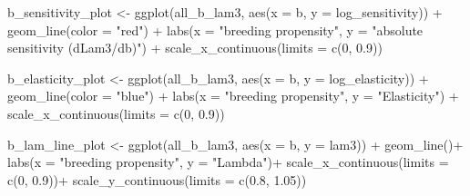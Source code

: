 \documentclass[
  letterpaper,
  DIV=11,
  numbers=noendperiod]{scrartcl}
\newenvironment{Shaded}{\begin{snugshade}}{\end{snugshade}}
\newcommand{\AttributeTok}[1]{\textcolor[rgb]{0.40,0.45,0.13}{#1}}
\newcommand{\DecValTok}[1]{\textcolor[rgb]{0.68,0.00,0.00}{#1}}
\newcommand{\FloatTok}[1]{\textcolor[rgb]{0.68,0.00,0.00}{#1}}
\newcommand{\FunctionTok}[1]{\textcolor[rgb]{0.28,0.35,0.67}{#1}}
\newcommand{\NormalTok}[1]{\textcolor[rgb]{0.00,0.23,0.31}{#1}}
\newcommand{\OtherTok}[1]{\textcolor[rgb]{0.00,0.23,0.31}{#1}}
\newcommand{\SpecialCharTok}[1]{\textcolor[rgb]{0.37,0.37,0.37}{#1}}
\newcommand{\StringTok}[1]{\textcolor[rgb]{0.13,0.47,0.30}{#1}}
\begin{document}
\begin{Shaded}
\begin{Highlighting}[]
\NormalTok{b\_sensitivity\_plot }\OtherTok{\textless{}{-}} \FunctionTok{ggplot}\NormalTok{(all\_b\_lam3, }\FunctionTok{aes}\NormalTok{(}\AttributeTok{x =}\NormalTok{ b, }\AttributeTok{y =}\NormalTok{ log\_sensitivity)) }\SpecialCharTok{+}
  \FunctionTok{geom\_line}\NormalTok{(}\AttributeTok{color =} \StringTok{"red"}\NormalTok{) }\SpecialCharTok{+}
  \FunctionTok{labs}\NormalTok{(}\AttributeTok{x =} \StringTok{"breeding propensity"}\NormalTok{,}
       \AttributeTok{y =} \StringTok{"absolute sensitivity (dLam3/db)"}\NormalTok{) }\SpecialCharTok{+}
  \FunctionTok{scale\_x\_continuous}\NormalTok{(}\AttributeTok{limits =} \FunctionTok{c}\NormalTok{(}\DecValTok{0}\NormalTok{, }\FloatTok{0.9}\NormalTok{))}

\NormalTok{b\_elasticity\_plot }\OtherTok{\textless{}{-}} \FunctionTok{ggplot}\NormalTok{(all\_b\_lam3, }\FunctionTok{aes}\NormalTok{(}\AttributeTok{x =}\NormalTok{ b, }\AttributeTok{y =}\NormalTok{ log\_elasticity)) }\SpecialCharTok{+}
  \FunctionTok{geom\_line}\NormalTok{(}\AttributeTok{color =} \StringTok{"blue"}\NormalTok{) }\SpecialCharTok{+}
  \FunctionTok{labs}\NormalTok{(}\AttributeTok{x =} \StringTok{"breeding propensity"}\NormalTok{,}
       \AttributeTok{y =} \StringTok{"Elasticity"}\NormalTok{) }\SpecialCharTok{+}
  \FunctionTok{scale\_x\_continuous}\NormalTok{(}\AttributeTok{limits =} \FunctionTok{c}\NormalTok{(}\DecValTok{0}\NormalTok{, }\FloatTok{0.9}\NormalTok{))}

\NormalTok{b\_lam\_line\_plot }\OtherTok{\textless{}{-}} \FunctionTok{ggplot}\NormalTok{(all\_b\_lam3, }\FunctionTok{aes}\NormalTok{(}\AttributeTok{x =}\NormalTok{ b, }\AttributeTok{y =}\NormalTok{ lam3)) }\SpecialCharTok{+} 
  \FunctionTok{geom\_line}\NormalTok{()}\SpecialCharTok{+}
  \FunctionTok{labs}\NormalTok{(}\AttributeTok{x =} \StringTok{"breeding propensity"}\NormalTok{,}
        \AttributeTok{y =} \StringTok{"Lambda"}\NormalTok{)}\SpecialCharTok{+}
  \FunctionTok{scale\_x\_continuous}\NormalTok{(}\AttributeTok{limits =} \FunctionTok{c}\NormalTok{(}\DecValTok{0}\NormalTok{, }\FloatTok{0.9}\NormalTok{))}\SpecialCharTok{+}
  \FunctionTok{scale\_y\_continuous}\NormalTok{(}\AttributeTok{limits =} \FunctionTok{c}\NormalTok{(}\FloatTok{0.8}\NormalTok{, }\FloatTok{1.05}\NormalTok{))}


\end{Highlighting}
\end{Shaded}
\end{document}
